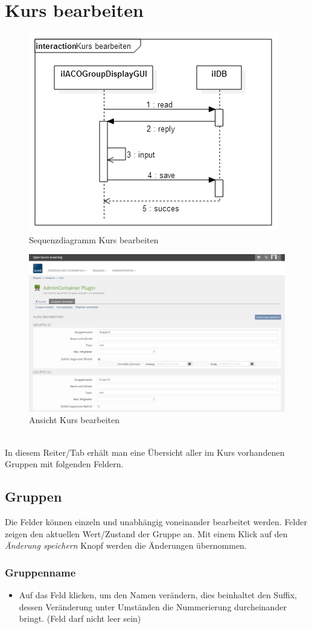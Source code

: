 \section{Kurs bearbeiten}
\begin{figure}[h!]
	\centering
	\includegraphics[width=.45\textwidth]{img/seq_groupdisplayGUI.png}
	\caption{Sequenzdiagramm Kurs bearbeiten}
\end{figure}
\begin{figure}[h!]
	\centering
	\includegraphics[width=.95\textwidth]{img/kursBearbeiten.png}
	\caption{Ansicht Kurs bearbeiten}
\end{figure}


~\\In diesem Reiter/Tab erhält man eine Übersicht aller im Kurs vorhandenen Gruppen mit folgenden Feldern.
\newpage
\subsection*{Gruppen}
Die Felder können einzeln und unabhängig voneinander bearbeitet werden. Felder zeigen den aktuellen Wert/Zustand der Gruppe an. 
Mit einem Klick auf den \textit{Änderung speichern} Knopf werden die Änderungen übernommen. 

\subsubsection{Gruppenname}
\begin{itemize}
	\item Auf das Feld klicken, um den Namen verändern, dies beinhaltet den Suffix, dessen Veränderung unter Umständen die Nummerierung durcheinander bringt. (Feld darf nicht leer sein)
\end{itemize}


